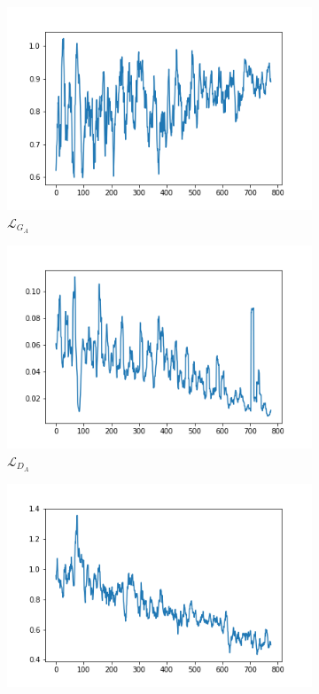 \documentclass[twocolumn,11pt]{ctexart}
\begin{document}
\begin{figure}[htb]
    \centering
    \begin{subfigure}[b]{0.23\linewidth}
        \includegraphics[width=\linewidth]{exp3_G_A.png}
        \caption{$\mathcal{L}_{G_A}$}
      \end{subfigure}
      \begin{subfigure}[b]{0.23\linewidth}
        \includegraphics[width=\linewidth]{exp3_D_A.png}
        \caption{$\mathcal{L}_{D_A}$}
      \end{subfigure}
      \begin{subfigure}[b]{0.23\linewidth}
        \includegraphics[width=\linewidth]{exp3_cycle_A.png}

\end{subfigure}
\end{figure}
\end{document}
